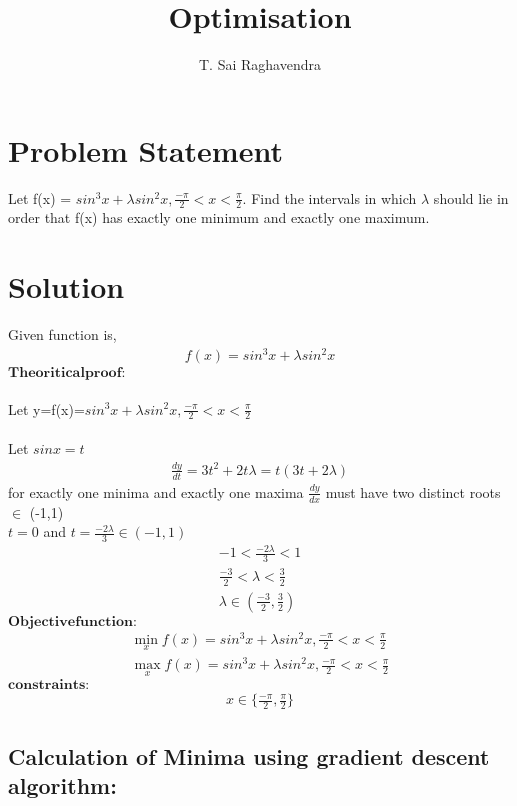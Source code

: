 \documentclass[journal,12pt,twocolumn]{IEEEtran}
\title{\mytitle}
\title{
Optimisation
}
\author{T. Sai Raghavendra}
\let\vec\mathbf
\begin{document}
\maketitle
\tableofcontents
\bigskip


\section{\textbf{Problem Statement}}
Let f(x) = $sin^3 x+\lambda sin^2 x, \frac{-\pi}{2} < x < \frac{\pi}{2} $. Find the intervals in which $\lambda$ should lie in order that f(x) has exactly one minimum and exactly one maximum.\\


\section{\textbf{Solution}}
Given function is,
	\begin{align}
	\label{eq:one}
	f(x)= sin^3 x+\lambda sin^2 x
	\end{align}
	$\vec{Theoritical proof:}$\\ \\
Let y=f(x)=$sin^3 x+\lambda sin^2 x, \frac{-\pi}{2} < x < \frac{\pi}{2} $\\ \\
Let $sinx=t$
    \begin{align}
	 \frac{dy}{dt}=3t^2+2t\lambda=t(3t+2\lambda)
	 \end{align}
	 for exactly one minima and exactly one maxima  $\frac{dy}{dx} $ must have two distinct roots $\in$ (-1,1) \\
	 $t=0$ and $t=\frac{-2\lambda}{3}\in (-1,1)$\\
	 \begin{align}
	 -1<\frac{-2\lambda}{3}<1\\
	 \frac{-3}{2}<\lambda<\frac{3}{2}\\
	 \lambda\in (\frac{-3}{2},\frac{3}{2})
	 \end{align}
	$\vec{Objective function:}$
	\begin{align}
	\min_xf(x)= sin^3 x+\lambda sin^2 x, \frac{-\pi}{2} < x < \frac{\pi}{2} \\
	\max_xf(x)= sin^3 x+\lambda sin^2 x, \frac{-\pi}{2} < x < \frac{\pi}{2} 
        \end{align}
	$\vec{constraints:}$
	\begin{align}
		x \in \{ \frac{-\pi}{2}, \frac{\pi}{2}\} 
	\end{align}
\small\subsection{Calculation of Minima using gradient descent algorithm:}
\end{document}
